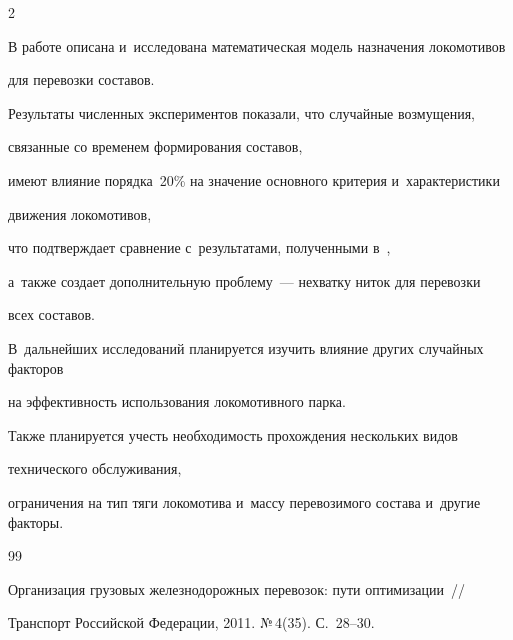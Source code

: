 \begin{multicols}{2}
\vspace*{-2pt}





В работе описана и~исследована математическая модель назначения локомотивов 


для перевозки составов.


Результаты численных экспериментов показали, что случайные возмущения, 


связанные со временем формирования составов,


имеют  влияние порядка~20\% на значение основного критерия и~характеристики


 движения локомотивов,


что подтверждает сравнение с~результатами, полученными в~\cite{AzanovBuyanov},


а~также создает дополнительную проблему~--- нехватку ниток для перевозки 


всех составов.


В~дальнейших исследований планируется изучить влияние других случайных факторов


на эффективность использования локомотивного парка.


Также планируется учесть необходимость прохождения нескольких видов 


технического обслуживания,


ограничения на тип тяги локомотива и~массу перевозимого состава и~другие факторы.





\renewcommand{\figurename}{\protect\bf Рис.}








{\small\frenchspacing


 {%




 \begin{thebibliography}{99}









Организация грузовых железнодорожных перевозок: пути оптимизации~// 


Транспорт Российской Федерации, 2011. №\,4(35). С.~28--30.






\end{thebibliography}}}
\end{multicols}
